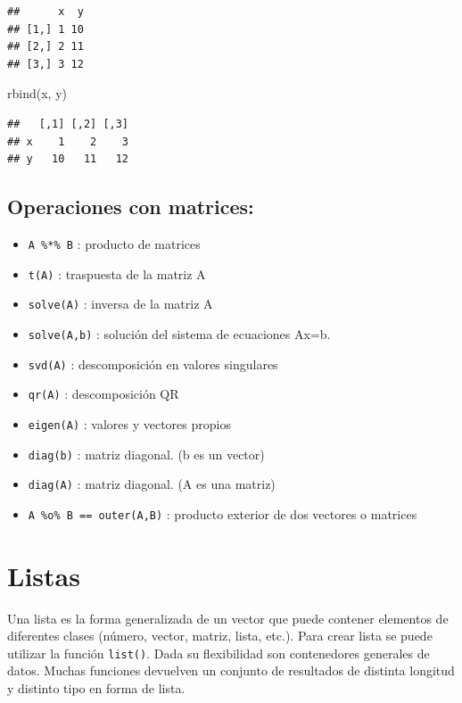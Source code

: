 \documentclass[
]{book}
\newenvironment{Shaded}{\begin{snugshade}}{\end{snugshade}}
\newcommand{\FunctionTok}[1]{\textcolor[rgb]{0.00,0.00,0.00}{#1}}
\newcommand{\NormalTok}[1]{#1}
\providecommand{\tightlist}{%
  \setlength{\itemsep}{0pt}\setlength{\parskip}{0pt}}
\begin{document}
\begin{verbatim}
##      x  y
## [1,] 1 10
## [2,] 2 11
## [3,] 3 12
\end{verbatim}

\begin{Shaded}
\begin{Highlighting}[]
\FunctionTok{rbind}\NormalTok{(x, y)}
\end{Highlighting}
\end{Shaded}

\begin{verbatim}
##   [,1] [,2] [,3]
## x    1    2    3
## y   10   11   12
\end{verbatim}

\hypertarget{operaciones-con-matrices}{%
\subsection{Operaciones con matrices:}\label{operaciones-con-matrices}}

\begin{itemize}
\tightlist
\item
  \texttt{A\ \%*\%\ B} : producto de matrices
\item
  \texttt{t(A)} : traspuesta de la matriz A
\item
  \texttt{solve(A)} : inversa de la matriz A
\item
  \texttt{solve(A,b)} : solución del sistema de ecuaciones Ax=b.
\item
  \texttt{svd(A)} : descomposición en valores singulares
\item
  \texttt{qr(A)} : descomposición QR
\item
  \texttt{eigen(A)} : valores y vectores propios
\item
  \texttt{diag(b)} : matriz diagonal. (b es un vector)
\item
  \texttt{diag(A)} : matriz diagonal. (A es una matriz)
\item
  \texttt{A\ \%o\%\ B\ ==\ outer(A,B)} : producto exterior de dos vectores o matrices
\end{itemize}

\hypertarget{listas}{%
\section{Listas}\label{listas}}

Una lista es la forma generalizada de un vector que puede contener elementos de diferentes clases (número, vector, matriz, lista, etc.). Para crear lista se puede utilizar la función \texttt{list()}. Dada su flexibilidad son contenedores generales de datos. Muchas funciones devuelven un conjunto de resultados de distinta longitud y distinto tipo en forma de lista.
\end{document}
